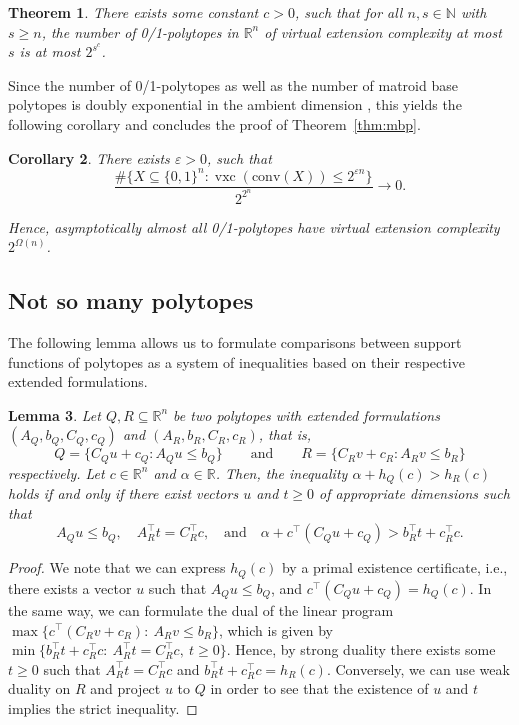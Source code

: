 \documentclass[centering,11pt,reqno]{amsart}
\newtheorem{theorem}{Theorem}[section]
\newtheorem{lem}[theorem]{Lemma}
\newtheorem{cor}[theorem]{Corollary}
\theoremstyle{definition}
\newcommand{\R}{\mathbb{R}}
\DeclareMathOperator{\vxc}{vxc}
\def\R{\mathbb{R}}
\def\N{\mathbb{N}}
\begin{document}
\begin{theorem}\label{thm:counting}
    There exists some constant $c>0$, such that for all $n,s\in\N$ with $s\ge n$, the number of 0/1-polytopes in $\R^n$ of virtual extension complexity at most $s$ is at most $2^{s^c}$.
\end{theorem}

Since the number of 0/1-polytopes as well as the number of matroid base polytopes is doubly exponential
in the ambient dimension \cite{Dukes2003}, this yields the following corollary and concludes the proof of Theorem~\ref{thm:mbp}.

\begin{cor}\label{cor:0-1}
    There exists $\varepsilon>0$, such that 
    \[\frac{\#\{X\subseteq\{0,1\}^n:\vxc(\mathrm{conv}(X))\le 2^{\varepsilon n}\}}{2^{2^n}}\longrightarrow0.\]

    Hence, asymptotically almost all 0/1-polytopes have virtual extension complexity $2^{\Omega(n)}$.
\end{cor}




\subsection{Not so many polytopes}
The following lemma allows us to formulate comparisons between support functions of polytopes as a system of inequalities based on their respective extended formulations.

\begin{lem}\label{lem:certificates}
    Let $Q,R\subseteq\R^n$ be two polytopes with extended formulations $(A_Q,b_Q,C_Q,c_Q)$ and $(A_R,b_R,C_R,c_R)$, that is, 
    \[
    Q=\{C_Qu+c_Q:A_Qu\le b_Q\}\qquad\text{and}\qquad R=\{C_Rv+c_R:A_Rv\le b_R\}
    \]
    respectively.
    Let $c\in\R^n$ and $\alpha\in\R$.
    Then, the inequality $\alpha+h_Q(c)>h_R(c)$ holds if and only if there exist vectors $u$ and $t\ge 0$ of appropriate dimensions such that
    \[A_Qu\le b_Q,\quad A_R^{\top}t=C_R^{\top}c,\quad \text{and}\quad \alpha+c^{\top}(C_Qu+c_Q)>b_R^{\top}t+c_R^{\top}c.\]
\end{lem}
\begin{proof}
    We note that we can express $h_Q(c)$ by a primal existence certificate, i.e., there exists a vector $u$ such that $A_Qu\le b_Q$, and $c^{\top}(C_Qu+c_Q)=h_Q(c)$.
    In the same way, we can formulate the dual of the linear program $\max\{c^{\top}(C_Rv+c_R):\ A_Rv\le b_R\}$, which is given by $\min\{b_R^\top t+c_R^\top c:\ A_R^\top t=C_R^\top c,\ t\ge0\}$.
    Hence, by strong duality there exists some $t\ge0$ such that $A_R^{\top}t=C_R^{\top}c$ and $b_R^{\top}t+c_R^{\top}c= h_R(c)$.
    Conversely, we can use weak duality on $R$ and project $u$ to $Q$ in order to see that the existence of $u$ and $t$ implies the strict inequality.
\end{proof}
\end{document}
